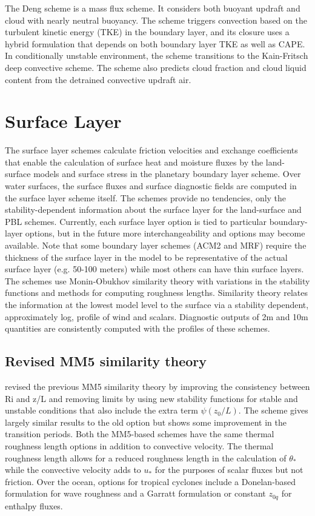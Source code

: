 The Deng scheme \citep{deng03} is a mass flux scheme. It considers both buoyant updraft and cloud with nearly neutral buoyancy.
The scheme triggers convection based on the turbulent kinetic energy (TKE) in the boundary layer, and its closure uses a
hybrid formulation that depends on both boundary layer TKE as well as CAPE.
In conditionally unstable environment, the scheme transitions to the Kain-Fritsch deep convective scheme.
The scheme also predicts cloud fraction and cloud liquid content from the detrained convective updraft air.

\section{Surface Layer}

The surface layer schemes calculate friction velocities and exchange 
coefficients that enable the calculation of surface heat and moisture 
fluxes by the land-surface models and surface stress in the planetary 
boundary layer scheme. Over water surfaces, the surface fluxes and surface 
diagnostic fields are computed in the surface layer scheme itself. The schemes 
provide no tendencies, only the stability-dependent information about 
the surface layer for the land-surface and PBL schemes.
Currently, each surface layer option is tied to particular boundary-layer
options, but in the future more interchangeability and options may become
available. Note that some boundary layer schemes (ACM2 and MRF) require
the thickness of the surface layer in the model to be representative of the
actual surface layer (e.g. 50-100 meters) while most others can have thin surface
layers. The schemes use Monin-Obukhov similarity theory with variations in
the stability functions and methods for computing roughness lengths.
Similarity theory relates the information at the lowest model level to the
surface via a stability dependent, approximately log, profile of wind and
scalars. Diagnostic outputs of 2m and 10m quantities are consistently
computed with the profiles of these schemes.

\subsection{Revised MM5 similarity theory}

\citet{jimenez12} revised the previous MM5 similarity theory by improving the
consistency between Ri and z/L and removing limits by using new stability
functions for stable and unstable conditions that also include the extra term
$\psi(z_0/L)$. The scheme gives largely similar results to the old option but shows
some improvement in the transition periods. Both the MM5-based schemes
have the same thermal roughness length options in addition to convective velocity.
The thermal roughness length allows for a reduced roughness length in 
the calculation of $\theta_*$ while the convective velocity adds to $u_*$
for the purposes of scalar fluxes but not friction. Over the ocean, options
for tropical cyclones include a Donelan-based formulation for wave
roughness and a Garratt formulation or constant $z_{0q}$ for enthalpy fluxes.

